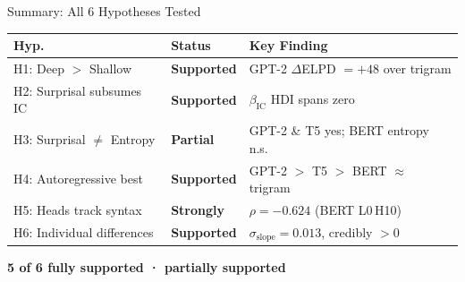 \documentclass[aspectratio=169]{beamer}
\begin{document}
\begin{frame}{Summary: All 6 Hypotheses Tested}

  \begin{table}
    \renewcommand{\arraystretch}{1.3}
    \begin{tabular}{llp{6cm}}
      \toprule
      \textbf{Hyp.} & \textbf{Status} & \textbf{Key Finding} \\
      \midrule
      H1: Deep $>$ Shallow
        & \textcolor{supported}{\textbf{Supported}}
        & GPT-2 $\Delta$ELPD $= +48$ over trigram \\
      H2: Surprisal subsumes IC
        & \textcolor{supported}{\textbf{Supported}}
        & $\beta_{\text{IC}}$ HDI spans zero \\
      H3: Surprisal $\neq$ Entropy
        & \textcolor{partial}{\textbf{Partial}}
        & GPT-2 \& T5 yes; BERT entropy n.s. \\
      H4: Autoregressive best
        & \textcolor{supported}{\textbf{Supported}}
        & GPT-2 $>$ T5 $>$ BERT $\approx$ trigram \\
      H5: Heads track syntax
        & \textcolor{supported}{\textbf{Strongly}}
        & $\rho = -0.624$ (BERT L0\,H10) \\
      H6: Individual differences
        & \textcolor{supported}{\textbf{Supported}}
        & $\sigma_{\text{slope}} = 0.013$, credibly $> 0$ \\
      \bottomrule
    \end{tabular}
  \end{table}

  \vspace{0.3em}
  \begin{center}
    \textbf{5 of 6 fully supported \; ·  partially supported}
  \end{center}
\end{frame}
\end{document}
